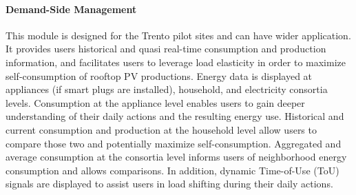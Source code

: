 \paragraph{Demand-Side Management} 

This module is designed for the Trento pilot sites and can have wider application.
It provides users historical and quasi real-time consumption and production information, and facilitates users to leverage load elasticity in order to maximize self-consumption of rooftop PV productions. 
Energy data is displayed at appliances (if smart plugs are installed), household, and electricity consortia levels. %
%
Consumption at the appliance level enables users to gain deeper understanding of their daily actions and the resulting energy use. 
% 
Historical and current consumption and production at the household level allow users to compare those two and potentially maximize self-consumption. 
% 
Aggregated and average consumption at the consortia level informs users of neighborhood energy consumption and allows comparisons.  
% 
In addition, dynamic Time-of-Use (ToU) signals are displayed  to assist users in load shifting during their daily actions.


